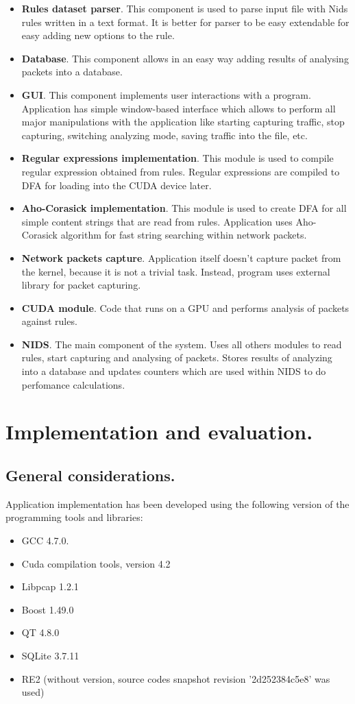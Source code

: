 \documentclass[thesis=M,english]{FITthesis}[2011/07/15]
\begin{document}
\begin{itemize}
\item \textbf{Rules dataset parser}. This component is used to parse input file with Nids rules written in a text format. It is better for parser to be easy extendable for easy adding new options to the rule.
\item \textbf{Database}. This component allows in an easy way adding results of analysing packets into a database.
\item \textbf{GUI}. This component implements user interactions with a program. Application has simple window-based interface which allows to perform all major manipulations with the application like starting capturing traffic, stop capturing, switching analyzing mode, saving traffic into the file, etc.
\item \textbf{Regular expressions implementation}. This module is used to compile regular expression obtained from rules. Regular expressions are compiled to DFA for loading into the CUDA device later.
\item \textbf{Aho-Corasick implementation}. This module is used to create DFA for all simple content strings that are read from rules. Application uses Aho-Corasick algorithm for fast string searching within network packets.
\item \textbf{Network packets capture}. Application itself doesn't capture packet from the kernel, because it is not a trivial task. Instead, program uses external library for packet capturing.
\item \textbf{CUDA module}. Code that runs on a GPU and performs analysis of packets against rules.
\item \textbf{NIDS}. The main component of the system. Uses all others modules to read rules, start capturing and analysing of packets. Stores results of analyzing into a database and updates counters which are used within NIDS to do perfomance calculations.
\end{itemize}

\chapter{Implementation and evaluation.}
\section{General considerations.}
Application implementation has been developed using the following version of the programming tools and libraries:
\begin{itemize}
\item GCC 4.7.0.
\item Cuda compilation tools, version 4.2
\item Libpcap 1.2.1
\item Boost 1.49.0
\item QT 4.8.0
\item SQLite 3.7.11
\item RE2 (without version, source codes snapshot revision '2d252384c5e8' was used)
\end{itemize}
\end{document}
